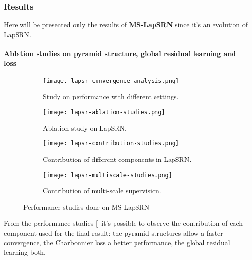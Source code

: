 \subsubsection{Results}

Here will be presented only the results of \textbf{MS-LapSRN}\cite{MSLapSRN} since it's an evolution of LapSRN.

\paragraph{Ablation studies on pyramid structure, global residual learning and loss}
\begin{figure}
    \begin{subfigure}{0.49\textwidth}
        \centering
        \texttt{[image: lapsr-convergence-analysis.png]}
        \caption{Study on performance with different settings.}
    \end{subfigure}
    \begin{subfigure}{0.49\textwidth}
        \centering
        \texttt{[image: lapsr-ablation-studies.png]}
        \caption{Ablation study on LapSRN.}
    \end{subfigure}
    \begin{subfigure}{0.49\textwidth}
        \centering
        \texttt{[image: lapsr-contribution-studies.png]}
        \caption{Contribution of different components in LapSRN.}
    \end{subfigure}
    \begin{subfigure}{0.49\textwidth}
        \centering
        \texttt{[image: lapsr-multiscale-studies.png]}
        \caption{Contribution of multi-scale supervision.}
    \end{subfigure}
    \caption{Performance studies done on MS-LapSRN}\label{lapsr:performance-studies}
\end{figure}

From the performance studies [] it's possible to observe the contribution of each component used for the final result: the pyramid structures allow a faster convergence, the Charbonnier loss a better performance, the global residual learning both.

